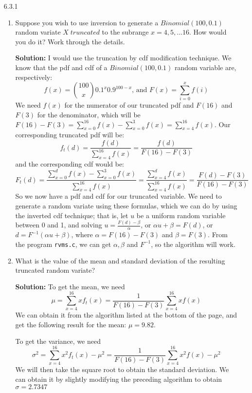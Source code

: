 \documentclass[11pt]{article} %
\newcommand{\inv}{^{-1}}
\begin{document}
\begin{enumerate}
\begin{enumerate}
\end{enumerate}

\item[6.3.1] \begin{enumerate}

\item Suppose you wish to use inversion to generate a $Binomial(100,0.1)$ random variate $X\;truncated$ to the subrange $x = 4, 5, \dots 16$.  How would you do it? Work through the details.

{\bf Solution:} I would use the truncation by cdf modification technique.  We know that the pdf and cdf of a $Binomial(100,0.1)$ random variable are, respectively: 
$$f(x) = \binom{100}{x}0.1^x0.9^{100-x}\textrm{, and } F(x) = \sum_{i = 0}^xf(i)$$
We need $f(x)$ for the numerator of our truncated pdf and $F(16)$ and $F(3)$ for the denominator, which will be $F(16)-F(3) = \sum_{x= 0}^{16}f(x) - \sum_{x=0}^3f(x) = \sum_{x = 4}^{16}f(x)$.  Our corresponding truncated pdf will be: 
$$f_t(d) = \frac{f(d)}{\sum_{x = 4}^{16}f(x)} = \frac{f(d)}{F(16) - F(3)}$$
and the corresponding cdf would be:
$$F_t(d) = \frac{\sum_{x = 0}^df(x) - \sum_{x = 0}^3f(x)}{\sum_{x = 4}^{16}f(x)} = 
\frac{\sum_{x = 4}^df(x)}{\sum_{x = 4}^{16}f(x)} = \frac{F(d) - F(3)}{F(16) - F(3)}$$
So we now have a pdf and cdf for our truncated variable.  We need to generate a random variate using these formulas, which we can do by using the inverted cdf technique; that is, let $u$ be a uniform random variable between 0 and 1, and solving $u = \frac{F(d) - \beta}{\alpha}$, or $\alpha u + \beta = F(d)$, or $d = F\inv(\alpha u + \beta)$, where $\alpha = F(16) - F(3)$ and $\beta = F(3)$.  From the program \texttt{rvms.c}, we can get $\alpha, \beta$ and $F\inv$, so the algorithm will work.

\newpage

\item What is the value of the mean and standard deviation of the resulting truncated random variate?

{\bf Solution:} To get the mean, we need 
$$\mu = \sum_{x = 4}^{16}xf_t(x) = \frac{1}{F(16) - F(3)}\sum_{x = 4}^{16}xf(x)$$
We can obtain it from the algorithm listed at the bottom of the page, and get the following result for the mean: $\boxed{\mu = 9.82}$.

To get the variance, we need 
$$\sigma^2 = \sum_{x = 4}^{16}x^2f_t(x) - \mu^2 = \frac{1}{F(16) - F(3)}\sum_{x = 4}^{16}x^2f(x) - \mu^2$$
We will then take the square root to obtain the standard deviation.  We can obtain it by slightly modifying the preceding algorithm to obtain $\boxed{\sigma = 2.7347}$


\end{enumerate}
\end{enumerate}
\end{document}
